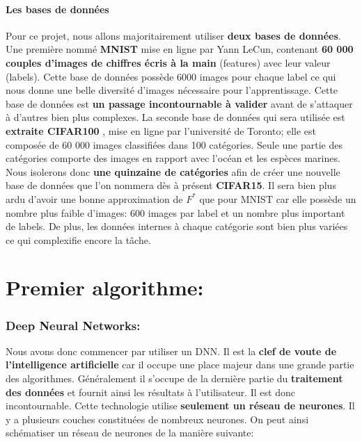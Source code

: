 \documentclass[12pt,a4paper]{extarticle}
\begin{document}
\subsection{Les bases de données}
Pour ce projet, nous allons majoritairement utiliser \textbf{deux bases de données}. Une première nommé \textbf{MNIST} \cite{mnist} mise en ligne par Yann LeCun, contenant \textbf{60 000 couples d'images de chiffres écris à la main} (features) avec leur valeur (labels). Cette base de données possède 6000 images pour chaque label ce qui nous donne une belle diversité d'images nécessaire pour l'apprentissage. Cette base de données est\textbf{ un passage incontournable à valider} avant de s'attaquer à d'autres bien plus complexes. La seconde base de données qui sera utilisée est \textbf{extraite CIFAR100 }\cite{cifar}, mise en ligne par l'université de Toronto; elle est composée de 60 000 images classifiées dans 100 catégories. Seule une partie des catégories comporte des images en rapport avec l'océan et les espèces marines. Nous isolerons donc \textbf{une quinzaine de catégories} afin de créer une nouvelle base de données que l'on nommera dès à présent \textbf{CIFAR15}. Il sera bien plus ardu d'avoir une bonne approximation de $F^*$ que pour MNIST car elle possède un nombre plus faible d'images: 600 images par label et un nombre plus important de labels. De plus, les données internes à chaque catégorie sont bien plus variées ce qui complexifie encore la tâche.

\part{Premier algorithme:}


\section{Deep Neural Networks:}
Nous avons donc commencer par utiliser un DNN. Il est la \textbf{clef de voute de l'intelligence artificielle} car il occupe une place majeur dans une grande partie des algorithmes. Généralement il s'occupe de la dernière partie du \textbf{traitement des données} et fournit ainsi les résultats à l'utilisateur. Il est donc incontournable. Cette technologie utilise \textbf{seulement un réseau de neurones}. Il y a plusieurs couches constituées de nombreux neurones. On peut ainsi schématiser un réseau de neurones de la manière suivante: \\
\end{document}
